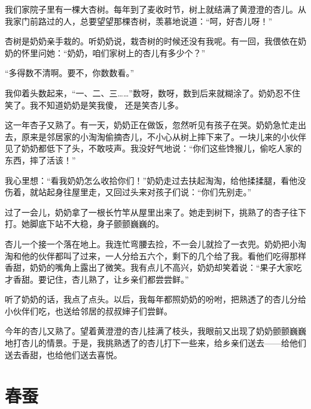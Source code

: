 \documentclass[12pt,UTF-8,openany]{ctexbook}
\begin{document}
\begin{large}
    
    我们家院子里有一棵大杏树。每年到了麦收时节，树上就结满了黄澄澄的杏儿。从我家门前路过的人，总要望望那棵杏树，羡慕地说道：“呵，好杏儿呀！”
    
    杏树是奶奶亲手栽的。听奶奶说，栽杏树的时候还没有我呢。有一回，我偎依在奶奶的怀里问她：“奶奶，咱们家树上的杏儿有多少个？”
    
    “多得数不清啊。要不，你数数看。”
    
    我仰着头数起来，“一、二、三……”数呀，数呀，数到后来就糊涂了。奶奶忍不住笑了。我不知道奶奶是笑我傻， 还是笑杏儿多。
    
    这一年杏子又熟了。有一天，奶奶正在做饭，忽然听见有孩子在哭。奶奶急忙走出去，原来是邻居家的小淘淘偷摘杏儿，不小心从树上摔下来了。一块儿来的小伙伴见了奶奶都低下了头，不敢吱声。我没好气地说：“你们这些馋猴儿，偷吃人家的东西，摔了活该！”
    
    我心里想：“看我奶奶怎么收拾你们！”奶奶走过去扶起淘淘，给他揉揉腿，看他没伤着，就站起身往屋里走，又回过头来对孩子们说：“你们先别走。”
    
    过了一会儿，奶奶拿了一根长竹竿从屋里出来了。她走到树下，挑熟了的杏子往下打。她脚底下站不大稳，身子颤颤巍巍的。
    
    杏儿一个接一个落在地上。我连忙弯腰去捡，不一会儿就捡了一衣兜。奶奶把小淘淘和他的伙伴都叫了过来，一人分给五六个，剩下的几个给了我。看他们吃得那样香甜，奶奶的嘴角上露出了微笑。我有点儿不高兴，奶奶却笑着说：“果子大家吃才香甜。要记住，杏儿熟了，让乡亲们都尝尝鲜。''
    
    听了奶奶的话，我点了点头。以后，我每年都照奶奶的吩咐，把熟透了的杏儿分给小伙伴们吃，也送给邻居的叔叔婶子们尝鲜。
    
    今年的杏儿又熟了。望着黄澄澄的杏儿挂满了枝头，我眼前又出现了奶奶颤颤巍巍地打杏儿的情景。于是，我挑熟透了的杏儿打下一些来，给乡亲们送去——给他们送去香甜，也给他们送去喜悦。
    
\end{large}



\chapter{春蚕}
\end{document}
